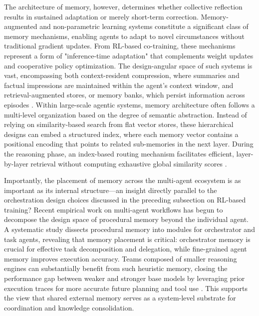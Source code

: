 \documentclass[11pt,a4paper]{article}
\begin{document}
The architecture of memory, however, determines whether collective reflection results in sustained adaptation or merely short-term correction. Memory-augmented and non-parametric learning systems constitute a significant class of memory mechanisms, enabling agents to adapt to novel circumstances without traditional gradient updates. From RL-based co-training, these mechanisms represent a form of "inference-time adaptation" that complements weight updates and cooperative policy optimization. The design-angular space of such systems is vast, encompassing both context-resident compression, where summaries and factual impressions are maintained within the agent's context window, and retrieval-augmented stores, or memory banks, which persist information across episodes \cite{arxiv:2603.07670v1}. Within large-scale agentic systems, memory architecture often follows a multi-level organization based on the degree of semantic abstraction. Instead of relying on similarity-based search from flat vector stores, these hierarchical designs can embed a structured index, where each memory vector contains a positional encoding that points to related sub-memories in the next layer. During the reasoning phase, an index-based routing mechanism facilitates efficient, layer-by-layer retrieval without computing exhaustive global similarity scores \cite{arxiv:2507.22925v1}.

Importantly, the placement of memory across the multi-agent ecosystem is as important as its internal structure---an insight directly parallel to the orchestration design choices discussed in the preceding subsection on RL-based training? Recent empirical work on multi-agent workflows has begun to decompose the design space of procedural memory beyond the individual agent. A systematic study dissects procedural memory into modules for orchestrator and task agents, revealing that memory placement is critical: orchestrator memory is crucial for effective task decomposition and delegation, while fine-grained agent memory improves execution accuracy. Teams composed of smaller reasoning engines can substantially benefit from such heuristic memory, closing the performance gap between weaker and stronger base models by leveraging prior execution traces for more accurate future planning and tool use \cite{arxiv:2510.04851v1}. This supports the view that shared external memory serves as a system-level substrate for coordination and knowledge consolidation.
\end{document}
